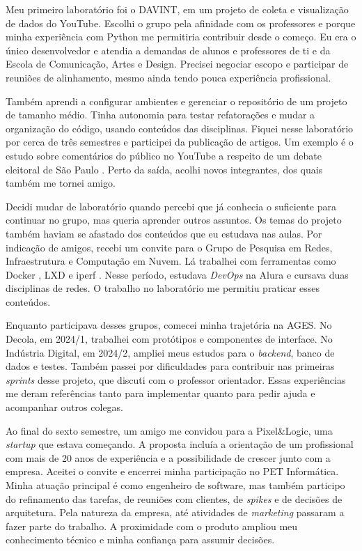 Meu primeiro laboratório foi o DAVINT, em um projeto de coleta e
visualização de dados do YouTube. Escolhi o grupo pela afinidade com os
professores e porque minha experiência com Python me permitiria contribuir
desde o começo. Eu era o único desenvolvedor e atendia a demandas de alunos
e professores de \ac{ti} e da Escola de Comunicação,
Artes e Design. Precisei negociar escopo e participar de reuniões de
alinhamento, mesmo ainda tendo pouca experiência profissional.

Também aprendi a configurar ambientes e gerenciar o repositório de um
projeto de tamanho médio. Tinha autonomia para testar refatorações e mudar
a organização do código, usando conteúdos das disciplinas. Fiquei nesse
laboratório por cerca de três semestres e participei da publicação de
artigos. Um exemplo é o estudo sobre comentários do público no YouTube a
respeito de um debate eleitoral de São Paulo \cite{kurtz2025flying}.
Perto da saída, acolhi novos integrantes, dos quais também me tornei amigo.

Decidi mudar de laboratório quando percebi que já conhecia o suficiente
para continuar no grupo, mas queria aprender outros assuntos. Os temas do
projeto também haviam se afastado dos conteúdos que eu estudava nas aulas.
Por indicação de amigos, recebi um convite para o Grupo de Pesquisa em
Redes, Infraestrutura e Computação em Nuvem. Lá trabalhei com ferramentas
como Docker \cite{docker-docs}, LXD \cite{lxd-docs} e iperf
\cite{iperf-docs}. Nesse período, estudava \textit{DevOps} na Alura
\cite{alura-devops} e cursava duas disciplinas de redes. O trabalho no
laboratório me permitiu praticar esses conteúdos.

Enquanto participava desses grupos, comecei minha trajetória na AGES.
No Decola, em 2024/1, trabalhei com protótipos e componentes de interface.
No Indústria Digital, em 2024/2, ampliei meus estudos para o
\textit{backend}, banco de dados e testes. Também passei por dificuldades
para contribuir nas primeiras \textit{sprints} desse projeto, que discuti
com o professor orientador. Essas experiências me deram referências tanto
para implementar quanto para pedir ajuda e acompanhar outros colegas.

Ao final do sexto semestre, um amigo me convidou para a Pixel\&Logic,
uma \textit{startup} que estava começando. A proposta incluía a orientação
de um profissional com mais de 20 anos de experiência e a possibilidade
de crescer junto com a empresa. Aceitei o convite e encerrei minha
participação no PET Informática. Minha atuação principal é como engenheiro
de software, mas também participo do refinamento das tarefas, de reuniões
com clientes, de \textit{spikes} e de decisões de arquitetura. Pela natureza
da empresa, até atividades de \textit{marketing} passaram a fazer parte do
trabalho. A proximidade com o produto ampliou meu conhecimento técnico e
minha confiança para assumir decisões.

